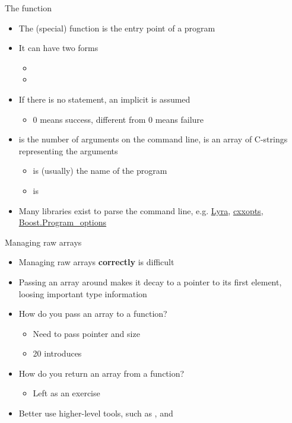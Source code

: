 \begin{frame}{The  function}
  \begin{itemize}
  \item The  (special) function is the entry point of a program
  \item It can have two forms
    \begin{itemize}
    \item {}
    \item {}
    \end{itemize}
  \item If there is no  statement, an implicit  is assumed
    \begin{itemize}
    \item $0$ means success, different from $0$ means failure
    \end{itemize}
  \item {} is the number of arguments on the command line, 
    is an array of C-strings representing the arguments
    \begin{itemize}
    \item {} is (usually) the name of the program
    \item {} is 
    \end{itemize}
  \item Many libraries exist to parse the command line, e.g.
    \href{https://github.com/bfgroup/Lyra}{Lyra},
    \href{https://github.com/jarro2783/cxxopts}{cxxopts},
    \href{https://www.boost.org/doc/libs/release/libs/program_options/}{Boost.Program_options}
  \end{itemize}
\end{frame}

\begin{frame}{Managing raw arrays}

  \begin{itemize}
  \item Managing raw arrays \textbf{correctly} is difficult
  \item Passing an array around makes it decay to a pointer to its first
    element, loosing important type information
  \item How do you pass an array to a function?
    \begin{itemize}
    \item Need to pass pointer and size
    \item \Cpp{}20 introduces 
    \end{itemize}
  \item How do you return an array from a function?
    \begin{itemize}
    \item Left as an exercise
    \end{itemize}
  \item Better use higher-level tools, such as ,
     and 
  \end{itemize}
\end{frame}

